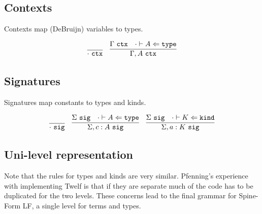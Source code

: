 \documentclass[11pt,twoside]{article}
\begin{document}

\subsection{Contexts}

Contexts map (DeBruijn) variables to types.  

\newcommand{\Ctx}{\ \mathtt{ctx}}
\bigskip 
\framebox{$\Gamma\Ctx$}
\bigskip 

$$
\begin{array}{cc}
\infer{\cdot\Ctx}{} &
\infer{\Gamma,A\Ctx}{\Gamma\Ctx & \CheckTy[\cdot]{A}{\Type}}
\end{array} 
$$


\subsection{Signatures}

Signatures map constants to types and kinds.

\newcommand{\Sig}{\ \mathtt{sig}}
\bigskip 
\framebox{$\Sigma\Sig$}
\bigskip 

$$
\begin{array}{ccc}
\infer{\cdot\Sig}{}&
\infer{\Sigma,c:A\Sig}{\Sigma\Sig & \CheckTy[\cdot]{A}{\Type}}&
\infer{\Sigma,a:K\Sig}{\Sigma\Sig & \CheckTy[\cdot]{K}{\Kind}}
\end{array} 
$$


\subsection{Uni-level representation}

Note that the rules for types and kinds are very similar.
Pfenning's experience with implementing Twelf is that if they
are separate much of the code has to be duplicated for
the two levels.  These concerns lead to the final 
grammar for Spine-Form LF, a single level for terms and types.
\end{document}
